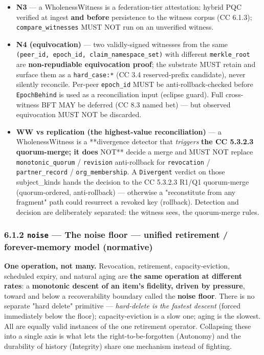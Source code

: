 \documentclass[11pt]{article}
\begin{document}
\begin{itemize}\setlength\itemsep{0pt}
\item \textbf{N3} — a WholenessWitness is a federation-tier attestation: hybrid PQC verified at ingest \textbf{and before} persistence to the witness corpus (CC 6.1.3); \texttt{compare\_witnesses} MUST NOT run on an unverified witness.
\item \textbf{N4 (equivocation)} — two validly-signed witnesses from the same \texttt{(peer\_id, epoch\_id, claim\_namespace\_set)} with different \texttt{merkle\_root} are \textbf{non-repudiable equivocation proof}; the substrate MUST retain and surface them as a \texttt{hard\_case:*} (CC 3.4 reserved-prefix candidate), never silently reconcile. Per-peer \texttt{epoch\_id} MUST be anti-rollback-checked before \texttt{EpochBehind} is used as a reconciliation input (eclipse guard). Full cross-witness BFT MAY be deferred (CC 8.3 named bet) — but observed equivocation MUST NOT be discarded.
\item \textbf{WW vs replication (the highest-value reconciliation)} — a WholenessWitness is a **divergence detector that \textit{triggers}\textbf{ the CC 5.3.2.3 quorum-merge; it does }NOT** decide a merge and MUST NOT replace \texttt{monotonic\_quorum} / \texttt{revision} anti-rollback for \texttt{revocation} / \texttt{partner\_record} / \texttt{org\_membership}. A \texttt{Divergent} verdict on those subject\_kinds hands the decision to the CC 5.3.2.3 R1/Q1 quorum-merge (quorum-ordered, anti-rollback) — otherwise a "reconstitute from any fragment" path could resurrect a revoked key (rollback). Detection and decision are deliberately separated: the witness sees, the quorum-merge rules.
\end{itemize}


\subsubsection*{6.1.2 \texttt{noise} — The noise floor — unified retirement / forever-memory model (normative)}


\textbf{One operation, not many.} Revocation, retirement, capacity-eviction, scheduled expiry, and natural aging are \textbf{the same operation at different rates}: a \textbf{monotonic descent of an item's fidelity, driven by pressure}, toward and below a recoverability boundary called the \textbf{noise floor}. There is no separate "hard delete" primitive — \textit{hard-delete is the fastest descent} (forced immediately below the floor); capacity-eviction is a slow one; aging is the slowest. All are equally valid instances of the one retirement operator. Collapsing these into a single axis is what lets the right-to-be-forgotten (Autonomy) and the durability of history (Integrity) share one mechanism instead of fighting.
\end{document}
